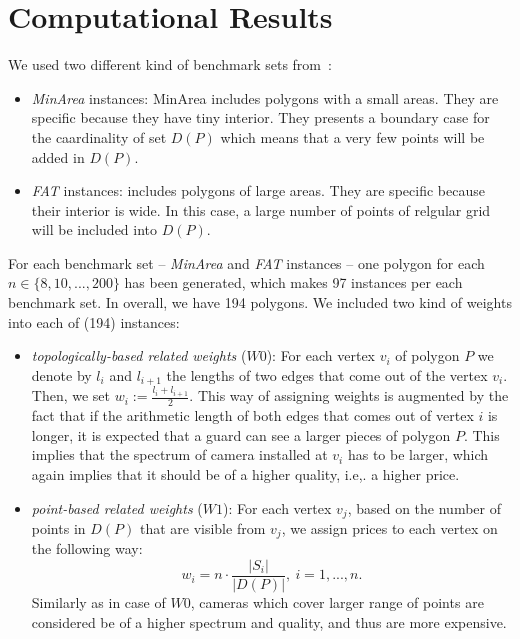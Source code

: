 \documentclass[runningheads,a4paper]{elsarticle}
\begin{document}
	\section{Computational Results}

 We used two different kind of benchmark sets from~\cite{tomas2006visibility}:
     \begin{itemize}
     	 \item \emph{MinArea} instances: MinArea includes polygons with a small areas. They are specific because they have tiny interior. They presents a boundary case for the caardinality of set $D(P)$ which means that a very few points will be added in $D(P)$.
     	 \item \emph{FAT} instances:  includes polygons of large areas. They are specific because their interior is wide. In this case, a large number of points of relgular grid will be included into $D(P)$.
     \end{itemize}
     For each benchmark set -- \emph{MinArea} and \emph{FAT} instances -- one polygon for each $n \in\{8,10,...,200\}$ has been generated, which makes 97 instances per each benchmark set. In overall, we have 194 polygons.
	We included two kind of weights into each of (194) instances:
	\begin{itemize}
		\item \emph{topologically-based related weights} ($W0$): For each vertex $v_i$ of polygon $P$ we denote by $l_i$ and $l_{i+1}$ the lengths of two edges that come out of the vertex $v_i$. Then, we set $w_i := \frac{l_i + l_{i+1}}{2}$. This way of assigning weights is augmented by the fact that if the arithmetic length of both edges that comes out of vertex $i$ is longer, it is expected that a guard can see a larger pieces of polygon $P$. This implies that the spectrum of camera installed at $v_i$ has to be larger, which again implies that it should be of a higher quality, i.e,. a higher price.
		\item \emph{point-based related weights} ($W1$): For each vertex $v_j$, based on the number of points in $D(P)$ that are visible from $v_j$, we assign prices to each vertex on the following way:
		\begin{equation}
		w_i = n \cdot \frac{|S_i|}{|D(P)|},\ i=1,...,n.
		\end{equation}
    Similarly as in case of $W0$, cameras which cover larger range of points are considered be of a higher spectrum and quality, and thus are more expensive. 
	\end{itemize}
\end{document}
